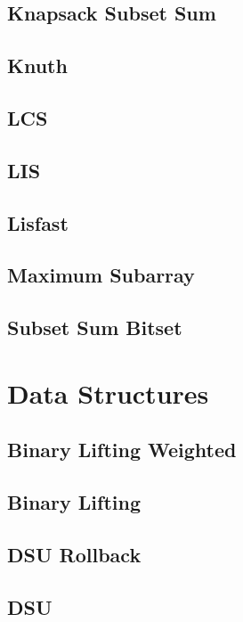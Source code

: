 \documentclass[a4paper,10pt]{article}
\begin{document}
\subsection{Knapsack Subset Sum}

\subsection{Knuth}

\subsection{LCS}

\subsection{LIS}

\subsection{Lisfast}

\subsection{Maximum Subarray}

\subsection{Subset Sum Bitset}

\section{Data Structures}
\subsection{Binary Lifting Weighted}

\subsection{Binary Lifting}

\subsection{DSU Rollback}

\subsection{DSU}

\end{document}
